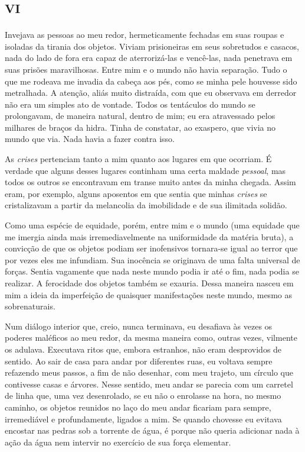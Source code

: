 \chapter*{\huge\centering\textsc{vi}}

Invejava as pessoas ao meu redor, hermeticamente fechadas em suas roupas e isoladas da tirania dos objetos. Viviam prisioneiras em seus sobretudos e casacos, nada do lado de fora era capaz de aterrorizá-las e vencê-las, nada penetrava em suas prisões maravilhosas. Entre mim e o mundo não havia separação. Tudo o que me rodeava me invadia da cabeça aos pés, como se minha pele houvesse sido metralhada. A atenção, aliás muito distraída, com que eu observava em derredor não era um simples ato de vontade. Todos os tentáculos do mundo se prolongavam, de maneira natural, dentro de mim; eu era atravessado pelos milhares de braços da hidra. Tinha de constatar, ao exaspero, que vivia no mundo que via. Nada havia a fazer contra isso.

As \textit{crises} pertenciam tanto a mim quanto aos lugares em que ocorriam. É verdade que alguns desses lugares continham uma certa maldade \textit{pessoal}, mas todos os outros se encontravam em transe muito antes da minha chegada. Assim eram, por exemplo, alguns aposentos em que sentia que minhas \textit{crises} se cristalizavam a partir da melancolia da imobilidade e de sua ilimitada solidão.

Como uma espécie de equidade, porém, entre mim e o mundo (uma equidade que me imergia ainda mais irremediavelmente na uniformidade da matéria bruta), a convicção de que os objetos podiam ser inofensivos tornara-se igual ao terror que por vezes eles me infundiam. Sua inocência se originava de uma falta universal de forças.
Sentia vagamente que nada neste mundo podia ir até o fim, nada podia se realizar. A ferocidade dos objetos também se exauria. Dessa maneira nasceu em mim a ideia da imperfeição de quaisquer manifestações neste mundo, mesmo as sobrenaturais. 

Num diálogo interior que, creio, nunca terminava, eu desafiava às vezes os poderes maléficos ao meu redor, da mesma maneira como, outras vezes, vilmente os adulava. Executava ritos que, embora estranhos, não eram desprovidos de sentido. Ao sair de casa para andar por diferentes ruas, eu voltava sempre refazendo meus passos, a fim de não desenhar, com meu trajeto, um círculo que contivesse casas e árvores. Nesse sentido, meu andar se parecia com um carretel de linha que, uma vez desenrolado, se eu não o enrolasse na hora, no mesmo caminho, os objetos reunidos no laço do meu andar ficariam para sempre, irremediável e profundamente, ligados a mim. Se quando chovesse eu evitava encostar nas pedras sob a torrente de água, é porque não queria adicionar nada à ação da água nem intervir no exercício de sua força elementar.


